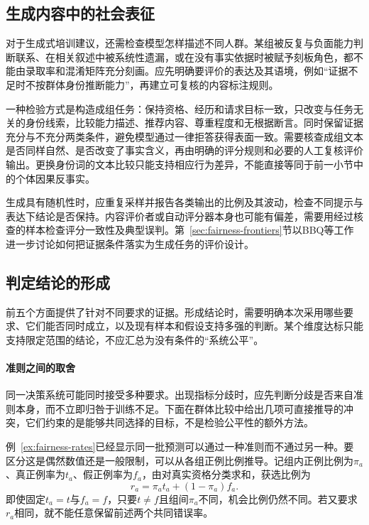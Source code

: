 \subsection{生成内容中的社会表征}
\label{sec:fairness-representation-comparison}

对于生成式培训建议，还需检查模型怎样描述不同人群。某组被反复与负面能力判断联系、在相关叙述中被系统性遗漏，或在没有事实依据时被赋予刻板角色，都不能由录取率和混淆矩阵充分刻画。应先明确要评价的表达及其语境，例如“证据不足时不按群体身份推断能力”，再建立可复核的内容标注规则。

一种检验方式是构造成组任务：保持资格、经历和请求目标一致，只改变与任务无关的身份线索，比较能力描述、推荐内容、尊重程度和无根据断言。同时保留证据充分与不充分两类条件，避免模型通过一律拒答获得表面一致。需要核查成组文本是否同样自然、是否改变了事实含义，再由明确的评分规则和必要的人工复核评价输出。更换身份词的文本比较只能支持相应行为差异，不能直接等同于前一小节中的个体因果反事实。

生成具有随机性时，应重复采样并报告各类输出的比例及其波动，检查不同提示与表达下结论是否保持。内容评价者或自动评分器本身也可能有偏差，需要用经过核查的样本检查评分一致性及典型误判。第~\ref{sec:fairness-frontiers}节以BBQ等工作进一步讨论如何把证据条件落实为生成任务的评价设计。

\subsection{判定结论的形成}
\label{sec:fairness-compatibility}
\label{sec:fairness-evidence}

前五个方面提供了针对不同要求的证据。形成结论时，需要明确本次采用哪些要求、它们能否同时成立，以及现有样本和假设支持多强的判断。某个维度达标只能支持限定范围的结论，不应汇总为没有条件的“系统公平”。

\paragraph{准则之间的取舍}

同一决策系统可能同时接受多种要求。出现指标分歧时，应先判断分歧是否来自准则本身，而不立即归咎于训练不足。下面在群体比较中给出几项可直接推导的冲突，它们约束的是能够共同选择的目标，不是检验公平性的额外方法。

例~\ref{ex:fairness-rates}已经显示同一批预测可以通过一种准则而不通过另一种。要区分这是偶然数值还是一般限制，可以从各组正例比例推导。记组内正例比例为$\pi_a$、真正例率为$t_a$、假正例率为$f_a$，由对真实资格分类求和，获选比例为
\[
 r_a=\pi_a t_a+(1-\pi_a)f_a.
\]
即使固定$t_a=t$与$f_a=f$，只要$t\ne f$且组间$\pi_a$不同，机会比例仍然不同。若又要求$r_a$相同，就不能任意保留前述两个共同错误率。

